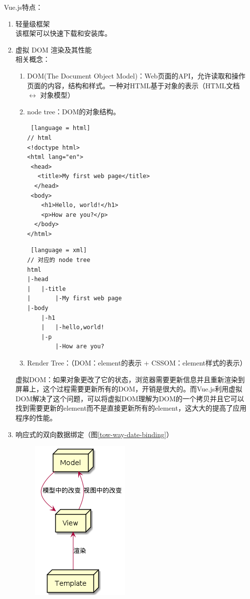 Vue.js特点：
\begin{enumerate}
    \item 轻量级框架\\该框架可以快速下载和安装库。
    \item 虚拟 DOM 渲染及其性能\\
          相关概念：
          \begin{enumerate}
              \item DOM(The Document Object Model)：Web页面的API，允许读取和操作页面的内容，结构和样式。一种对HTML基于对象的表示（HTML文档 $\leftrightarrow$ 对象模型）
              \item node tree：DOM的对象结构。
                    \begin{lstlisting} [language = html]
// html
<!doctype html>
<html lang="en">
 <head>
   <title>My first web page</title>
  </head>
 <body>
    <h1>Hello, world!</h1>
    <p>How are you?</p>
  </body>
</html>
          \end{lstlisting}
                    \begin{lstlisting} [language = xml]
// 对应的 node tree
html
|-head
|   |-title
|       |-My first web page
|-body
    |-h1
    |   |-hello,world!
    |-p
        |-How are you?
\end{lstlisting}
              \item Render Tree：（DOM：element的表示 + CSSOM：element样式的表示）
          \end{enumerate}
          虚拟DOM：如果对象更改了它的状态，浏览器需要更新信息并且重新渲染到屏幕上，这个过程需要更新所有的DOM，开销是很大的。而Vue.js利用虚拟DOM解决了这个问题，可以将虚拟DOM理解为DOM的一个拷贝并且它可以找到需要更新的element而不是直接更新所有的element，这大大的提高了应用程序的性能。
    \item 响应式的双向数据绑定（图\ref{tow-way-date-binding}）\\
          \begin{figure}[h]
              \centering
              \includegraphics[scale = 0.6]{out/uml/部署图/Two-way data binding/Two-way data binding.png}

\end{figure}
\end{enumerate}
